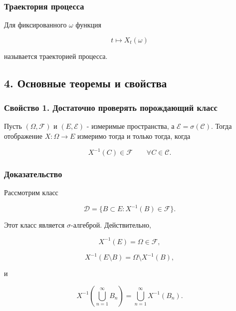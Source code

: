 \documentclass[
  11pt,
  a4paper,
]{article}
\begin{document}
\subsubsection{Траектория
процесса}\label{ux442ux440ux430ux435ux43aux442ux43eux440ux438ux44f-ux43fux440ux43eux446ux435ux441ux441ux430}

Для фиксированного \(\omega\) функция

\[
t\mapsto X_t(\omega)
\]

называется траекторией процесса.

\subsection{4. Основные теоремы и
свойства}\label{ux43eux441ux43dux43eux432ux43dux44bux435-ux442ux435ux43eux440ux435ux43cux44b-ux438-ux441ux432ux43eux439ux441ux442ux432ux430}

\subsubsection{Свойство 1. Достаточно проверять порождающий
класс}\label{ux441ux432ux43eux439ux441ux442ux432ux43e-1.-ux434ux43eux441ux442ux430ux442ux43eux447ux43dux43e-ux43fux440ux43eux432ux435ux440ux44fux442ux44c-ux43fux43eux440ux43eux436ux434ux430ux44eux449ux438ux439-ux43aux43bux430ux441ux441}

Пусть \((\Omega,\mathcal F)\) и \((E,\mathcal E)\) - измеримые
пространства, а \(\mathcal E=\sigma(\mathcal C)\). Тогда отображение
\(X:\Omega\to E\) измеримо тогда и только тогда, когда

\[
X^{-1}(C)\in\mathcal F
\qquad \forall C\in\mathcal C.
\]

\subsubsection{Доказательство}\label{ux434ux43eux43aux430ux437ux430ux442ux435ux43bux44cux441ux442ux432ux43e}

Рассмотрим класс

\[
\mathcal D=\{B\subset E:X^{-1}(B)\in\mathcal F\}.
\]

Этот класс является \(\sigma\)-алгеброй. Действительно,

\[
X^{-1}(E)=\Omega\in\mathcal F,
\]

\[
X^{-1}(E\setminus B)=\Omega\setminus X^{-1}(B),
\]

и

\[
X^{-1}\left(\bigcup_{n=1}^{\infty}B_n\right)
=
\bigcup_{n=1}^{\infty}X^{-1}(B_n).
\]
\end{document}
